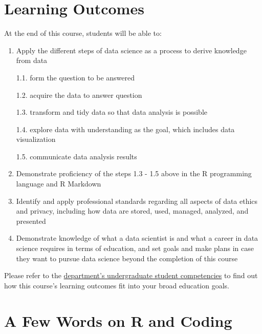 \documentclass[
]{book}
\begin{document}
\hypertarget{learning-outcomes}{%
\section{Learning Outcomes}\label{learning-outcomes}}

At the end of this course, students will be able to:

\begin{enumerate}
\def\labelenumi{\arabic{enumi}.}
\item
  Apply the different steps of data science as a process to derive knowledge from data

  1.1. form the question to be answered

  1.2. acquire the data to answer question

  1.3. transform and tidy data so that data analysis is possible

  1.4. explore data with understanding as the goal, which includes data visualization

  1.5. communicate data analysis results
\item
  Demonstrate proficiency of the steps 1.3 - 1.5 above in the R programming language and R Markdown
\item
  Identify and apply professional standards regarding all aspects of data ethics and privacy, including how data are stored, used, managed, analyzed, and presented
\item
  Demonstrate knowledge of what a data scientist is and what a career in data science requires in terms of education, and set goals and make plans in case they want to pursue data science beyond the completion of this course
\end{enumerate}

Please refer to the \href{https://ischool.arizona.edu/undergraduate-student-competencies}{department's undergraduate student competencies} to find out how this course's learning outcomes fit into your broad education goals.

\hypertarget{a-few-words-on-r-and-coding}{%
\section{A Few Words on R and Coding}\label{a-few-words-on-r-and-coding}}
\end{document}
